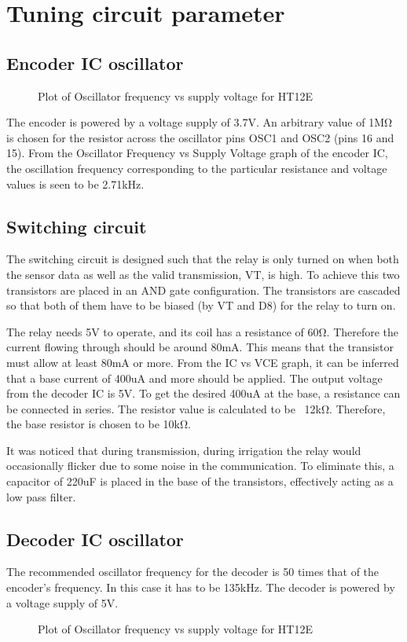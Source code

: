 \section{Tuning circuit parameter}
\subsection{Encoder IC oscillator}
\begin{figure}[ht]
  \centering
  \caption{Plot of Oscillator frequency vs supply voltage for HT12E}
\end{figure}

\vspace*{.5cm}
The encoder is powered by a voltage supply of 3.7V. An arbitrary
value of 1MΩ is chosen for the resistor across the oscillator pins
OSC1 and OSC2 (pins 16 and 15). From the Oscillator Frequency vs
Supply Voltage graph of the encoder IC, the oscillation frequency
corresponding to the particular resistance and voltage values is seen
to be 2.71kHz.

\subsection{Switching circuit}
The switching circuit is designed such that the relay is only turned
on when both the sensor data as well as the valid transmission, VT,
is high. To achieve this two transistors are placed in an AND gate
configuration. The transistors are cascaded so that both of them have
to be biased (by VT and D8) for the relay to turn on.

The relay needs 5V to operate, and its coil has a resistance of 60Ω.
Therefore the current flowing through should be around 80mA. This
means that the transistor must allow at least 80mA or more. From the
IC vs VCE graph, it can be inferred that a base current of 400uA and
more should be applied. The output voltage from the decoder IC is 5V.
To get the desired 400uA at the base, a resistance can be connected
in series. The resistor value is calculated to be ~12kΩ. Therefore,
the base resistor is chosen to be 10kΩ.

It was noticed that during transmission, during irrigation the relay
would occasionally flicker due to some noise in the communication. To
eliminate this, a capacitor of  220uF is placed in the base of the
transistors, effectively acting as a low pass filter.

\subsection{Decoder IC oscillator}
The recommended oscillator frequency for the decoder is 50 times that
of the encoder's frequency. In this case it has to be 135kHz. The
decoder is powered by a voltage supply of 5V.
\begin{figure}[ht]
  \centering
  \caption{Plot of Oscillator frequency vs supply voltage for HT12E}
\end{figure}

